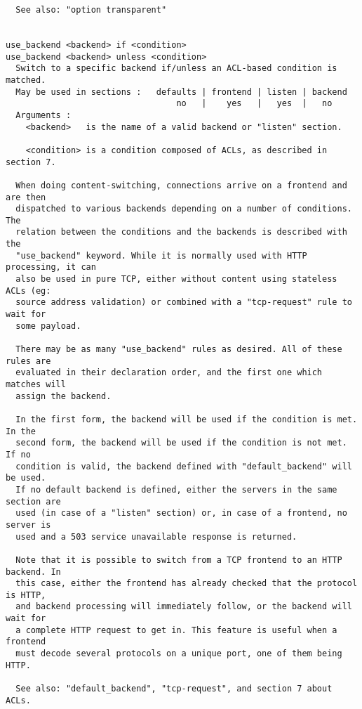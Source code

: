 \begin{verbatim}
  See also: "option transparent"


use_backend <backend> if <condition>
use_backend <backend> unless <condition>
  Switch to a specific backend if/unless an ACL-based condition is matched.
  May be used in sections :   defaults | frontend | listen | backend
                                  no   |    yes   |   yes  |   no
  Arguments :
    <backend>   is the name of a valid backend or "listen" section.

    <condition> is a condition composed of ACLs, as described in section 7.

  When doing content-switching, connections arrive on a frontend and are then
  dispatched to various backends depending on a number of conditions. The
  relation between the conditions and the backends is described with the
  "use_backend" keyword. While it is normally used with HTTP processing, it can
  also be used in pure TCP, either without content using stateless ACLs (eg:
  source address validation) or combined with a "tcp-request" rule to wait for
  some payload.

  There may be as many "use_backend" rules as desired. All of these rules are
  evaluated in their declaration order, and the first one which matches will
  assign the backend.

  In the first form, the backend will be used if the condition is met. In the
  second form, the backend will be used if the condition is not met. If no
  condition is valid, the backend defined with "default_backend" will be used.
  If no default backend is defined, either the servers in the same section are
  used (in case of a "listen" section) or, in case of a frontend, no server is
  used and a 503 service unavailable response is returned.

  Note that it is possible to switch from a TCP frontend to an HTTP backend. In
  this case, either the frontend has already checked that the protocol is HTTP,
  and backend processing will immediately follow, or the backend will wait for
  a complete HTTP request to get in. This feature is useful when a frontend
  must decode several protocols on a unique port, one of them being HTTP.

  See also: "default_backend", "tcp-request", and section 7 about ACLs.


\end{verbatim}
